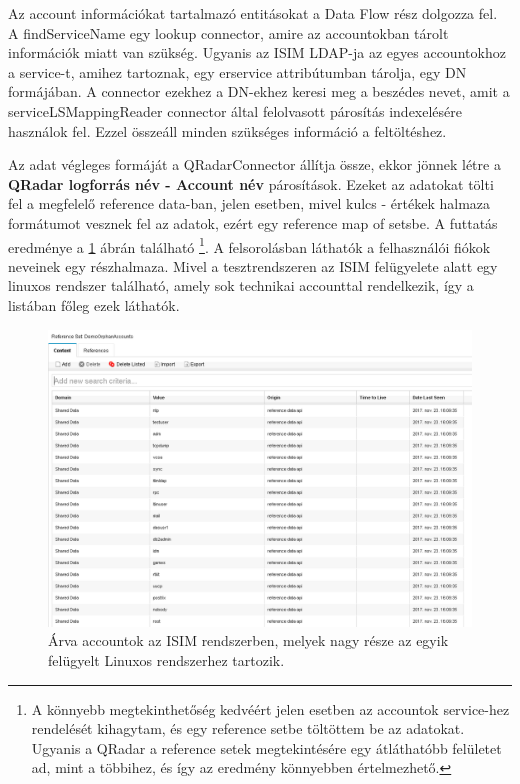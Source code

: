 Az account információkat tartalmazó entitásokat a Data Flow rész dolgozza fel. A findServiceName egy lookup connector, amire az accountokban tárolt információk miatt van szükség. Ugyanis az ISIM LDAP-ja az egyes accountokhoz a service-t, amihez tartoznak, egy erservice attribútumban tárolja, egy DN formájában.\cite{ldapdn} A connector ezekhez a DN-ekhez keresi meg a beszédes nevet, amit a serviceLSMappingReader connector által felolvasott párosítás indexelésére használok fel. Ezzel összeáll minden szükséges információ a feltöltéshez.

Az adat végleges formáját a QRadarConnector állítja össze, ekkor jönnek létre a \textbf{QRadar logforrás név - Account név } párosítások. Ezeket az adatokat tölti fel a megfelelő reference data-ban, jelen esetben, mivel kulcs - értékek halmaza formátumot vesznek fel az adatok, ezért egy reference map of setsbe. A futtatás eredménye a \ref{fig:orphanaccountresult} ábrán található
\footnote{A könnyebb megtekinthetőség kedvéért jelen esetben az accountok service-hez rendelését kihagytam, és egy reference setbe töltöttem be az adatokat. Ugyanis a QRadar a reference setek megtekintésére egy átláthatóbb felületet ad, mint a többihez, és így az eredmény könnyebben értelmezhető.}. 
A felsorolásban láthatók a felhasználói fiókok neveinek egy részhalmaza. Mivel a tesztrendszeren az ISIM felügyelete alatt egy linuxos rendszer található, amely sok technikai accounttal rendelkezik, így a listában főleg ezek láthatók.

\begin{figure}[h]
	\centering
	\includegraphics[width=1.0\linewidth]{figures/conn_test/orphanAccountResult}
	\caption{Árva accountok az ISIM rendszerben, melyek nagy része az egyik felügyelt Linuxos rendszerhez tartozik.}
	\label{fig:orphanaccountresult}
\end{figure}

